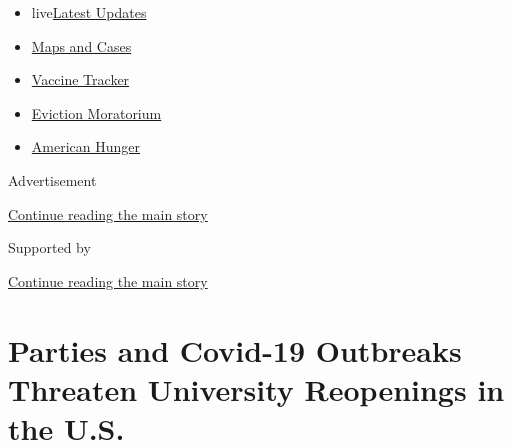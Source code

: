 \begin{itemize}
\tightlist
\item
  live\href{https://www.nytimes3xbfgragh.onion/2020/09/08/world/covid-19-coronavirus.html?name=styln-coronavirus-national\&region=TOP_BANNER\&block=storyline_menu_recirc\&action=click\&pgtype=Article\&impression_id=b3060d61-f1be-11ea-80a4-6f259d33a91b\&variant=undefined}{Latest
  Updates}
\item
  \href{https://www.nytimes3xbfgragh.onion/interactive/2020/us/coronavirus-us-cases.html?name=styln-coronavirus-national\&region=TOP_BANNER\&block=storyline_menu_recirc\&action=click\&pgtype=Article\&impression_id=b3060d62-f1be-11ea-80a4-6f259d33a91b\&variant=undefined}{Maps
  and Cases}
\item
  \href{https://www.nytimes3xbfgragh.onion/interactive/2020/science/coronavirus-vaccine-tracker.html?name=styln-coronavirus-national\&region=TOP_BANNER\&block=storyline_menu_recirc\&action=click\&pgtype=Article\&impression_id=b3060d63-f1be-11ea-80a4-6f259d33a91b\&variant=undefined}{Vaccine
  Tracker}
\item
  \href{https://www.nytimes3xbfgragh.onion/2020/09/02/your-money/eviction-moratorium-covid.html?name=styln-coronavirus-national\&region=TOP_BANNER\&block=storyline_menu_recirc\&action=click\&pgtype=Article\&impression_id=b3060d64-f1be-11ea-80a4-6f259d33a91b\&variant=undefined}{Eviction
  Moratorium}
\item
  \href{https://www.nytimes3xbfgragh.onion/interactive/2020/09/02/magazine/food-insecurity-hunger-us.html?name=styln-coronavirus-national\&region=TOP_BANNER\&block=storyline_menu_recirc\&action=click\&pgtype=Article\&impression_id=b3060d65-f1be-11ea-80a4-6f259d33a91b\&variant=undefined}{American
  Hunger}
\end{itemize}

Advertisement

\protect\hyperlink{after-top}{Continue reading the main story}

Supported by

\protect\hyperlink{after-sponsor}{Continue reading the main story}

\hypertarget{parties-and-covid-19-outbreaks-threaten-university-reopenings-in-the-us}{%
\section{Parties and Covid-19 Outbreaks Threaten University Reopenings
in the
U.S.}\label{parties-and-covid-19-outbreaks-threaten-university-reopenings-in-the-us}}

